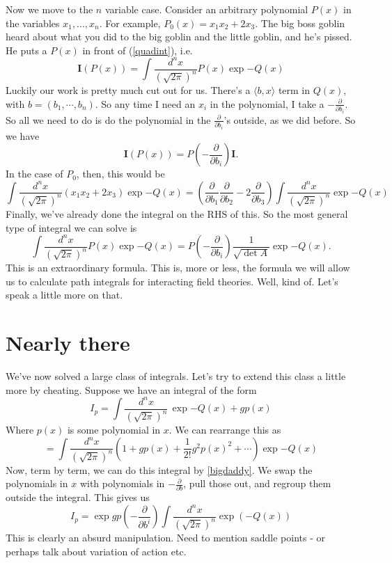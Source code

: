 \documentclass{book}
\begin{document}
Now we move to the $n$ variable case. Consider an arbitrary polynomial $P(x)$ in the variables $x_1,...,x_n$. For example, $P_0 (x) = x_1 x_2 + 2 x_3$. The big boss goblin heard about what you did to the big goblin and the little goblin, and he's pissed. He puts a $P(x)$ in front of (\ref{quadint}), i.e. 
\[
\mathbf{I} (P(x)) = \int \frac{d^n x}{(\sqrt{2\pi})^n} P(x) \exp{-Q(x)}
\]
Luckily our work is pretty much cut out for us. There's a $\langle b,x \rangle$ term in $Q(x)$, with $b = (b_1, \cdots, b_n)$. So any time I need an $x_i$ in the polynomial, I take a $-\frac{\partial}{\partial b_i}$. So all we need to do is do the polynomial in the $\frac{\partial}{\partial b_i}$'s outside, as we did before. So we have
\begin{equation} \label{bbg}
\boxed{\mathbf{I} (P(x)) = P\left(-\frac{\partial}{\partial b_i}\right) \mathbf{I}.}
\end{equation}
In the case of $P_0$, then, this would be
\[
\int \frac{d^n x}{(\sqrt{2\pi})^n} (x_1 x_2 + 2x_3) \exp{-Q(x)} =
\left(\frac{\partial}{\partial b_1} \frac{\partial}{\partial b_2} - 2 \frac{\partial}{\partial b_3} \right) \int \frac{d^n x}{(\sqrt{2\pi})^n} \exp{-Q(x)}
\]
Finally, we've already done the integral on the RHS of this. So the most general type of integral we can solve is
\begin{equation} \label{bigdaddy}
\boxed{\int \frac{d^n x}{(\sqrt{2\pi})^n} P(x) \exp{-Q(x)} = P\left(-\frac{\partial}{\partial b_i}\right)  \frac{1}{\sqrt{\det A}} \exp{-Q(x)}.}
\end{equation}
This is an extraordinary formula. This is, more or less, the formula we will allow us to calculate path integrals for interacting field theories. Well, kind of. Let's speak a little more on that.

\section{Nearly there}
We've now solved a large class of integrals. Let's try to extend this class a little more by cheating. Suppose we have an integral of the form 
\[
I_p = \int \frac{d^n x}{(\sqrt{2\pi})^n} \, \exp{-Q(x) + g p(x)}
\]
Where $p(x)$ is some polynomial in $x$. We can rearrange this as 
\[
= \int \frac{d^n x}{(\sqrt{2\pi})^n} \left(
1 + g p(x) + \frac{1}{2!}g^2 p(x)^2 + \cdots 
\right) \exp{-Q(x)}
\]
Now, term by term, we can do this integral by \ref{bigdaddy}. We swap the polynomials in $x$ with polynomials in $-\frac{\partial}{\partial b}$, pull those out, and regroup them outside the integral. This gives us
\[
I_p = \exp{g p \left( -\frac{\partial}{\partial b^i} \right)} \int \frac{d^n x}{(\sqrt{2\pi})^n}\exp (-Q(x))
\]
This is clearly an absurd manipulation. Need to mention saddle points - or perhaps talk about variation of action etc.
\end{document}
